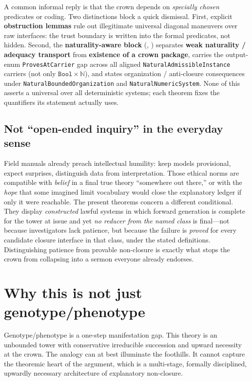 \documentclass[11pt,a4paper]{article}
\theoremstyle{definition}
\begin{document}
A common informal reply is that the crown depends on \emph{specially chosen} predicates or coding. Two distinctions block a quick dismissal. First, explicit \textbf{obstruction lemmas} rule out illegitimate universal diagonal maneuvers over raw interfaces: the trust boundary is written into the formal predicates, not hidden. Second, the \textbf{naturality-aware block} (, ) separates \textbf{weak naturality / adequacy transport} from \textbf{existence of a crown package}, carries the output-enum \texttt{ProvesAtCarrier} gap across all aligned \texttt{NaturalAdmissibleInstance} carriers (not only $\texttt{Bool}{\times}\mathbb{N}$), and states organization / anti-closure consequences under \texttt{NaturalBoundedOrganization} and \texttt{NaturalNumericSystem}. None of this asserts a universal over all deterministic systems; each theorem fixes the quantifiers its statement actually uses.

\subsection{Not ``open-ended inquiry'' in the everyday sense}

Field manuals already preach intellectual humility: keep models provisional, expect surprises, distinguish data from interpretation. Those ethical norms are compatible with \emph{belief} in a final true theory ``somewhere out there,'' or with the \emph{hope} that some imagined limit vocabulary would close the explanatory ledger if only it were reachable. The present theorems concern a different conditional. They display \emph{constructed} lawful systems in which forward generation is complete for the tower at issue and yet \emph{no reducer from the named class} is final---not because investigators lack patience, but because the failure is \emph{proved} for every candidate closure interface in that class, under the stated definitions. Distinguishing patience from provable non-closure is exactly what stops the crown from collapsing into a sermon everyone already endorses.

\section{Why this is not just genotype/phenotype}

Genotype/phenotype is a one-step manifestation gap. This theory is an unbounded tower with conservative irreducible succession and upward necessity at the crown. The analogy can at best illuminate the foothills. It cannot capture the theoremic heart of the argument, which is a multi-stage, formally disciplined, upwardly necessary architecture of explanatory non-closure.
\end{document}
